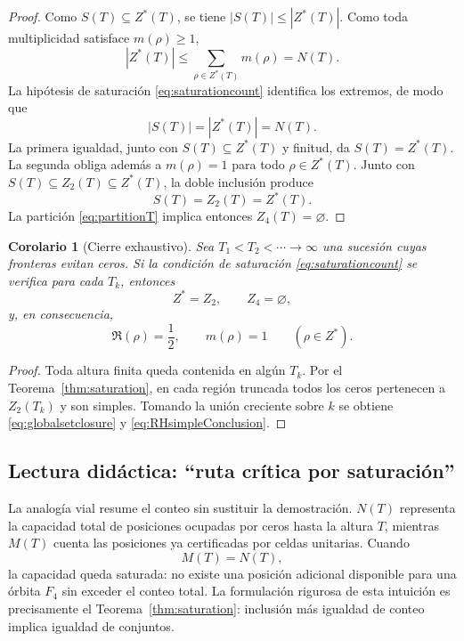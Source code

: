 \documentclass[11pt]{amsart}
\newtheorem{corollary}[theorem]{Corolario}
\theoremstyle{definition}
\theoremstyle{remark}
\begin{document}
\begin{proof}
Como $S(T)\subseteq Z^*(T)$, se tiene $|S(T)|\le |Z^*(T)|$. Como toda multiplicidad satisface $m(\rho)\ge1$,
\[
 |Z^*(T)|\le \sum_{\rho\in Z^*(T)}m(\rho)=N(T).
\]
La hipótesis de saturación \eqref{eq:saturationcount} identifica los extremos, de modo que
\[
 |S(T)|=|Z^*(T)|=N(T).
\]
La primera igualdad, junto con $S(T)\subseteq Z^*(T)$ y finitud, da $S(T)=Z^*(T)$. La segunda obliga además a $m(\rho)=1$ para todo $\rho\in Z^*(T)$. Junto con $S(T)\subseteq Z_2(T)\subseteq Z^*(T)$, la doble inclusión produce
\[
 S(T)=Z_2(T)=Z^*(T).
\]
La partición \eqref{eq:partitionT} implica entonces $Z_4(T)=\varnothing$.
\end{proof}

\begin{corollary}[Cierre exhaustivo]\label{cor:exhaustive}
Sea $T_1<T_2<\cdots\to\infty$ una sucesión cuyas fronteras evitan ceros. Si la condición de saturación \eqref{eq:saturationcount} se verifica para cada $T_k$, entonces
\begin{equation}\label{eq:globalsetclosure}
 Z^*=Z_2,\qquad Z_4=\varnothing,
\end{equation}
y, en consecuencia,
\begin{equation}\label{eq:RHsimpleConclusion}
 \Re(\rho)=\frac12,\qquad m(\rho)=1\qquad(\rho\in Z^*).
\end{equation}
\end{corollary}

\begin{proof}
Toda altura finita queda contenida en algún $T_k$. Por el Teorema~\ref{thm:saturation}, en cada región truncada todos los ceros pertenecen a $Z_2(T_k)$ y son simples. Tomando la unión creciente sobre $k$ se obtiene \eqref{eq:globalsetclosure} y \eqref{eq:RHsimpleConclusion}.
\end{proof}

\subsection{Lectura didáctica: ``ruta crítica por saturación''}
La analogía vial resume el conteo sin sustituir la demostración. $N(T)$ representa la capacidad total de posiciones ocupadas por ceros hasta la altura $T$, mientras $M(T)$ cuenta las posiciones ya certificadas por celdas unitarias. Cuando
\[
 M(T)=N(T),
\]
la capacidad queda saturada: no existe una posición adicional disponible para una órbita $F_4$ sin exceder el conteo total. La formulación rigurosa de esta intuición es precisamente el Teorema~\ref{thm:saturation}: inclusión más igualdad de conteo implica igualdad de conjuntos.
\end{document}
